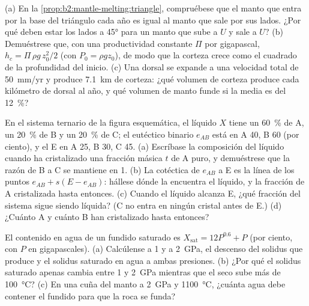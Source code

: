 \begin{exercise}[$\star\star\star$]\label{exo:b2:mantle-melting:10}
(a) En la \cref{prop:b2:mantle-melting:triangle}, compruébese que el manto que entra por la
base del triángulo cada año es igual al manto que sale por sus lados. ¿Por qué
deben estar los lados a \ang{45} para un manto que sube a $U$ y sale a $U$?
(b) Demuéstrese que, con una productividad constante $\Pi$ por gigapascal, $h_c = \Pi\,\rho
g\,z_0^2/2$ (con $P_0 = \rho g z_0$), de modo que la corteza crece como el cuadrado de la
profundidad del inicio. (c) Una dorsal se expande a una velocidad total de \qty{50}{mm/yr} y
produce \qty{7.1}{km} de corteza: ¿qué volumen de corteza produce cada kilómetro de dorsal
al año, y qué volumen de manto funde si la  media es del
\qty{12}{\percent}?
\end{exercise}

\begin{exercise}[$\star\star\star$]\label{exo:b2:mantle-melting:11}
En el sistema ternario de la figura esquemática, el líquido $X$ tiene un
\qty{60}{\percent} de A, un \qty{20}{\percent} de B y un \qty{20}{\percent} de C; el
eutéctico binario $e_{AB}$ está en A 40, B 60 (por ciento), y el  E en
A 25, B 30, C 45. (a) Escríbase la composición del líquido cuando ha cristalizado una fracción másica $t$
de A puro, y demuéstrese que la razón de B a C se mantiene en 1. (b) La
cotéctica de $e_{AB}$ a E es la línea de los puntos $e_{AB} + s(E - e_{AB})$: hállese
dónde la encuentra el líquido, y la fracción de A cristalizada hasta entonces. (c) Cuando
el líquido alcanza E, ¿qué fracción del sistema sigue siendo líquida? (C no entra en ningún
cristal antes de E.) (d) ¿Cuánto A y cuánto B han cristalizado hasta entonces?
\end{exercise}

\begin{exercise}[$\star\star\star$]\label{exo:b2:mantle-melting:12}
El contenido en agua de un fundido saturado es $X_{\mathrm{sat}} = 12P^{0.6} + P$
(por ciento, con $P$ en gigapascales). (a) Calcúlense a 1 y a \qty{2}{GPa}, el descenso del solidus
que produce y el solidus saturado en agua a ambas presiones. (b) ¿Por qué
el solidus saturado apenas cambia entre 1 y \qty{2}{GPa} mientras que el seco
sube más de \qty{100}{\celsius}? (c) En una cuña del manto a \qty{2}{GPa} y
\qty{1100}{\celsius}, ¿cuánta agua debe contener el fundido para que la roca se funda?
\end{exercise}

